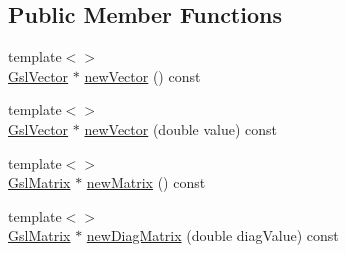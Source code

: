 \subsection*{Public Member Functions}
\begin{DoxyCompactItemize}
\item 
{\footnotesize template$<$$>$ }\\\hyperlink{class_q_u_e_s_o_1_1_gsl_vector}{Gsl\-Vector} $\ast$ \hyperlink{class_q_u_e_s_o_1_1_vector_space_a64856b952d372cb25d0f10853635104a}{new\-Vector} () const
\item 
{\footnotesize template$<$$>$ }\\\hyperlink{class_q_u_e_s_o_1_1_gsl_vector}{Gsl\-Vector} $\ast$ \hyperlink{class_q_u_e_s_o_1_1_vector_space_a840fde1ad7e947821dffd3d5ad164509}{new\-Vector} (double value) const
\item 
{\footnotesize template$<$$>$ }\\\hyperlink{class_q_u_e_s_o_1_1_gsl_matrix}{Gsl\-Matrix} $\ast$ \hyperlink{class_q_u_e_s_o_1_1_vector_space_ae28843e8ea7cd8b51aaea3318f6651eb}{new\-Matrix} () const
\item 
{\footnotesize template$<$$>$ }\\\hyperlink{class_q_u_e_s_o_1_1_gsl_matrix}{Gsl\-Matrix} $\ast$ \hyperlink{class_q_u_e_s_o_1_1_vector_space_aea4fbf9ced060c790c4f100a7604c271}{new\-Diag\-Matrix} (double diag\-Value) const
\end{DoxyCompactItemize}
